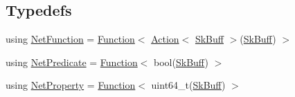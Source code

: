 \subsection*{Typedefs}
\begin{DoxyCompactItemize}
\item 
using \hyperlink{namespacepfq_1_1lang_aa02ee91ad7ff586907fc8526b84e0f53}{Net\+Function} = \hyperlink{structpfq_1_1lang_1_1Function}{Function}$<$ \hyperlink{structpfq_1_1lang_1_1Action}{Action}$<$ \hyperlink{structpfq_1_1lang_1_1SkBuff}{Sk\+Buff} $>$(\hyperlink{structpfq_1_1lang_1_1SkBuff}{Sk\+Buff}) $>$
\item 
using \hyperlink{namespacepfq_1_1lang_a3c5b96416a3c3834aefd442157498bbd}{Net\+Predicate} = \hyperlink{structpfq_1_1lang_1_1Function}{Function}$<$ bool(\hyperlink{structpfq_1_1lang_1_1SkBuff}{Sk\+Buff}) $>$
\item 
using \hyperlink{namespacepfq_1_1lang_aa39ba7aedac05c562ea2f9f399e7f370}{Net\+Property} = \hyperlink{structpfq_1_1lang_1_1Function}{Function}$<$ uint64\+\_\+t(\hyperlink{structpfq_1_1lang_1_1SkBuff}{Sk\+Buff}) $>$
\end{DoxyCompactItemize}
